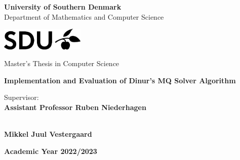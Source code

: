 \begin{center}
{\LARGE \textbf{University of Southern Denmark}} \\
\vspace{0.2cm}
{\Large {Department of Mathematics and Computer Science}} \\ 
\vspace{1cm}

\includegraphics[width=4cm]{figures/SDU-no-title.png} \\
\vspace{1cm}

{\Large {Master's Thesis in Computer Science}} \\
\vspace{1cm}

{\LARGE \textbf{Implementation and Evaluation of Dinur's MQ Solver Algorithm}} \\ 
\vspace{1cm}

\end{center}

\begin{multicols}{2}
\noindent \large{Supervisor:} \\
\large{\textbf{Assistant Professor Ruben Niederhagen}} \\
\columnbreak

 \\
\large{\textbf{Mikkel Juul Vestergaard}} \\
\end{multicols}
\vspace{4cm}

\begin{center}
    \large{\textbf{Academic Year 2022/2023}}
\end{center}


